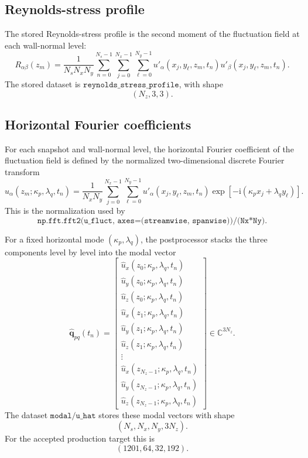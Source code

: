 \documentclass[11pt]{article}
\newcommand{\ii}{\mathrm{i}}
\newcommand{\bfq}{\bm{q}}
\begin{document}
\subsection{Reynolds-stress profile}

The stored Reynolds-stress profile is the second moment of the fluctuation
field at each wall-normal level:
\begin{equation}
  R_{\alpha\beta}(z_m)
  =
  \frac{1}{N_sN_xN_y}
  \sum_{n=0}^{N_s-1}
  \sum_{j=0}^{N_x-1}
  \sum_{\ell=0}^{N_y-1}
  u'_\alpha(x_j,y_\ell,z_m,t_n)
  u'_\beta(x_j,y_\ell,z_m,t_n).
  \label{eq:reynolds}
\end{equation}
The stored dataset is \(\texttt{reynolds\_stress\_profile}\), with shape
\[
  (N_z,3,3).
\]

\subsection{Horizontal Fourier coefficients}

For each snapshot and wall-normal level, the horizontal Fourier coefficient of
the fluctuation field is defined by the normalized two-dimensional discrete
Fourier transform
\begin{equation}
  \widehat{u}_{\alpha}(z_m;\kappa_p,\lambda_q,t_n)
  =
  \frac{1}{N_xN_y}
  \sum_{j=0}^{N_x-1}
  \sum_{\ell=0}^{N_y-1}
  u'_\alpha(x_j,y_\ell,z_m,t_n)
  \exp\left[-\ii(\kappa_p x_j+\lambda_q y_\ell)\right].
  \label{eq:fft_coeff}
\end{equation}
This is the normalization used by
\[
  \texttt{np.fft.fft2(u\_fluct, axes=(streamwise, spanwise))/(Nx*Ny)}.
\]

For a fixed horizontal mode \((\kappa_p,\lambda_q)\), the postprocessor stacks
the three components level by level into the modal vector
\begin{equation}
  \widehat{\bfq}_{pq}(t_n)
  =
  \begin{bmatrix}
    \widehat{u}_x(z_0;\kappa_p,\lambda_q,t_n)\\
    \widehat{u}_y(z_0;\kappa_p,\lambda_q,t_n)\\
    \widehat{u}_z(z_0;\kappa_p,\lambda_q,t_n)\\
    \widehat{u}_x(z_1;\kappa_p,\lambda_q,t_n)\\
    \widehat{u}_y(z_1;\kappa_p,\lambda_q,t_n)\\
    \widehat{u}_z(z_1;\kappa_p,\lambda_q,t_n)\\
    \vdots\\
    \widehat{u}_x(z_{N_z-1};\kappa_p,\lambda_q,t_n)\\
    \widehat{u}_y(z_{N_z-1};\kappa_p,\lambda_q,t_n)\\
    \widehat{u}_z(z_{N_z-1};\kappa_p,\lambda_q,t_n)
  \end{bmatrix}
  \in\mathbb{C}^{3N_z}.
  \label{eq:modal_vector}
\end{equation}
The dataset \(\texttt{modal/u\_hat}\) stores these modal vectors with shape
\[
  (N_s,N_x,N_y,3N_z).
\]
For the accepted production target this is
\[
  (1201,64,32,192).
\]
\end{document}
